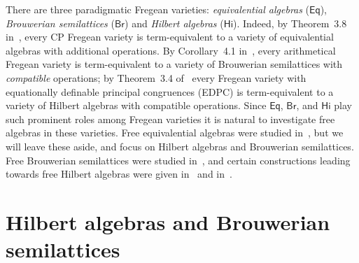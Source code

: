 \documentclass{amsart}
\newcommand{\var}[1]{\mathsf{#1}}
\begin{document}
There are three paradigmatic Fregean varieties:
\emph{equivalential algebras} ($\var{Eq}$), \emph{Brouwerian semilattices} 
($\var{Br}$) and \emph{Hilbert algebras} ($\var{Hi}$). Indeed, by Theorem~3.8
in~\cite{ISW09},  
every CP Fregean variety is term-equivalent to a variety of equivalential
algebras with additional operations. By Corollary~4.1 in~\cite{ISW09}, every
arithmetical Fregean variety is term-equivalent to a variety of Brouwerian
semilattices with \emph{compatible} operations; by Theorem~3.4 of~\cite{Agl01}
every Fregean variety with equationally definable principal congruences (EDPC)
is term-equivalent to a variety of Hilbert algebras with compatible operations.
Since $\var{Eq}$, $\var{Br}$, and $\var{Hi}$ play such prominent roles among
Fregean varieties it is natural to investigate free algebras in these varieties.
Free equivalential algebras were studied in~\cite{Slo08}, but we will leave
these aside, and focus on Hilbert algebras and Brouwerian semilattices.
Free Brouwerian semilattices were studied in~\cite{Koh81}, and 
certain constructions leading towards free Hilbert algebras were given
in~\cite{Die66} and in~\cite{Urq74}.

\section{Hilbert algebras and Brouwerian semilattices}\label{sec:Hi}
\end{document}
